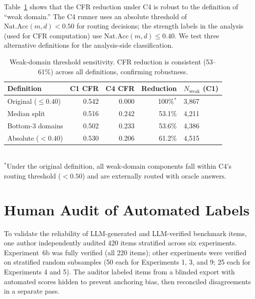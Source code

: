 \documentclass[10pt]{article}
\begin{document}
Table~\ref{tab:threshold} shows that the CFR reduction under C4 is robust to the
definition of ``weak domain.'' The C4 runner uses an absolute threshold of
$\text{Nat.Acc}(m,d) < 0.50$ for routing decisions; the strength labels in the
analysis (used for CFR computation) use $\text{Nat.Acc}(m,d) \leq 0.40$. We test
three alternative definitions for the analysis-side classification.

\begin{table}[h]
\centering
\caption{Weak-domain threshold sensitivity. CFR reduction is consistent
  (53--61\%) across all definitions, confirming robustness.}
\label{tab:threshold}
\small
\begin{tabular}{lrrrl}
\toprule
Definition & C1 CFR & C4 CFR & Reduction & $N_{\text{weak}}$ (C1) \\
\midrule
Original ($\leq 0.40$) & 0.542 & 0.000 & 100\%$^*$ & 3{,}867 \\
Median split & 0.516 & 0.242 & 53.1\% & 4{,}211 \\
Bottom-3 domains & 0.502 & 0.233 & 53.6\% & 4{,}386 \\
Absolute ($< 0.40$) & 0.530 & 0.206 & 61.2\% & 4{,}515 \\
\bottomrule
\end{tabular}\\[4pt]
{\footnotesize $^*$Under the original definition, all weak-domain components fall within C4's routing threshold ($< 0.50$) and are externally routed with oracle answers.}
\end{table}

\section{Human Audit of Automated Labels}
\label{app:audit}

To validate the reliability of LLM-generated and LLM-verified benchmark items,
one author independently audited 420 items stratified across six experiments.
Experiment~6b was fully verified (all 220 items); other experiments were verified
on stratified random subsamples (50 each for Experiments 1, 3, and 9; 25 each for
Experiments 4 and 5). The auditor labeled items from a blinded export with
automated scores hidden to prevent anchoring bias, then reconciled disagreements
in a separate pass.
\end{document}
